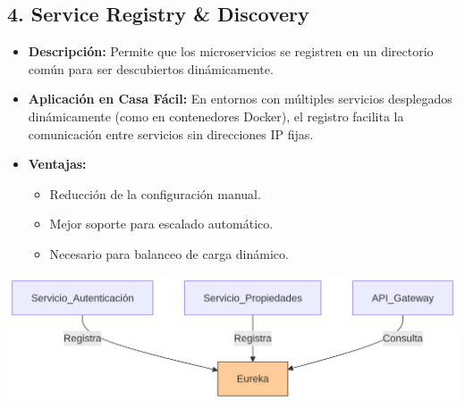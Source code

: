 	\subsection*{4. Service Registry \& Discovery}
		\begin{itemize}
			\item \textbf{Descripción:} Permite que los microservicios se registren en un directorio común para ser descubiertos dinámicamente.  
			\item \textbf{Aplicación en Casa Fácil:} En entornos con múltiples servicios desplegados dinámicamente (como en contenedores Docker), el registro facilita la comunicación entre servicios sin direcciones IP fijas.  
			\item 	\textbf{Ventajas:}
			\begin{itemize}
				\item Reducción de la configuración manual.
				\item Mejor soporte para escalado automático.
				\item Necesario para balanceo de carga dinámico.
			\end{itemize}
		\end{itemize}
		\begin{center}
			\includegraphics[width=\linewidth]{figures/patterns/SERVICE_R_D.png}
			\label{fig:img5}
		\end{center}
	
